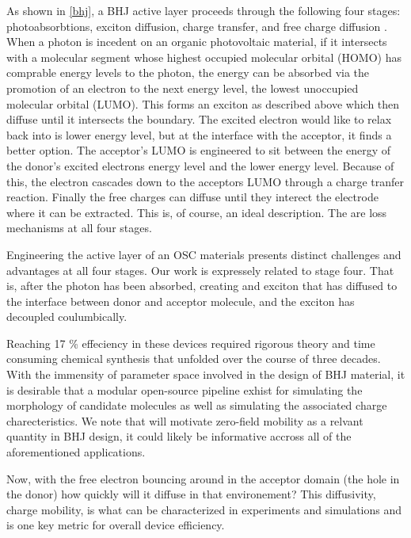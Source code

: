 As shown in \ref{bhj}, a BHJ active layer proceeds through the following four stages: photoabsorbtions, 
exciton diffusion, charge transfer, and free charge diffusion \citet{Fusella2019}. When a photon is incedent on
an organic photovoltaic material, if it intersects with a molecular segment whose 
highest occupied molecular orbital (HOMO) has comprable energy levels to the photon, the energy can be absorbed via the promotion of
an electron to the next energy level, the lowest unoccupied molecular orbital (LUMO). This forms an exciton as
described above which then diffuse until it intersects the boundary. The excited electron would like to relax
back into is lower energy level, but at the interface with the acceptor, it finds a better option. The
acceptor's LUMO is engineered to sit between the energy of the donor's excited electrons energy level and the
lower energy level. Because of this, the electron cascades down to the acceptors LUMO through a charge
tranfer reaction. Finally the free charges can diffuse until they interect the electrode where it can be
extracted. This is, of course, an ideal description. The are loss mechanisms at all four stages. 

Engineering the active layer of an OSC materials presents distinct challenges and advantages at
all four stages. 
Our work is expressely related to stage four. That is, after the photon has been absorbed, creating and
exciton that has diffused to the interface between donor and acceptor molecule, and the exciton has decoupled
coulumbically.

Reaching 17 \% effeciency in these devices required rigorous theory and time consuming chemical synthesis
that unfolded over the course of three decades.  
With the immensity of parameter space involved in the design of BHJ material, it is desirable that a modular
open-source pipeline exhist for simulating the morphology of candidate molecules as well as simulating the 
associated charge charecteristics. 
We note that will motivate zero-field mobility as a relvant quantity in BHJ
design, it could likely be informative accross all of the aforementioned applications. 


 Now, with the free electron bouncing around in the acceptor domain (the hole in the donor) how
quickly will it diffuse in that environement? This diffusivity, charge mobility, is what can be characterized in experiments and simulations and is one key metric for overall device efficiency.

